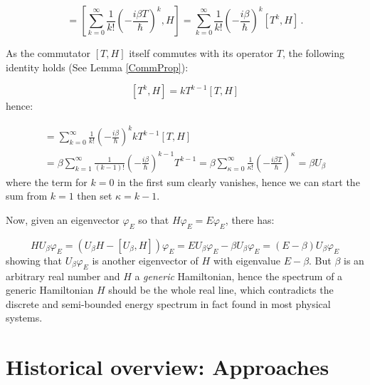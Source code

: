 \begin{equation}
[U_{\beta}, H]  =
\left[
  \sum_{k=0}^{\infty} \frac{1}{k!} \left(- \frac{i\beta T}{\hbar} \right)^k, H
\right]         =
\sum_{k=0}^{\infty} \frac{1}{k!} \left(- \frac{i\beta}{\hbar} \right)^k [T^k, H] \,\text{.}
\end{equation}

As the commutator $[T, H]$ itself commutes with its operator $T$,
the following identity holds (See Lemma \ref{CommProp}):

$$
[T^k, H] = kT^{k-1}[T, H]
$$
hence:

\begin{multline}
[U_{\beta}, H]  =
\sum_{k=0}^{\infty} \frac{1}{k!} \left(- \frac{i\beta}{\hbar} \right)^k kT^{k-1}[T, H] \\ =
\beta\sum_{k=1}^{\infty} \frac{1}{(k-1)!} \left(- \frac{i\beta}{\hbar} \right)^{k-1} T^{k-1} =
\beta\sum_{\kappa=0}^{\infty} \frac{1}{\kappa!} \left(- \frac{i\beta T}{\hbar} \right)^{\kappa}  =
\beta U_{\beta}
\end{multline}
where the term for $k=0$ in the first sum clearly vanishes, hence we can start the sum from
$k=1$ then set $\kappa=k-1$.

Now, given an eigenvector $\varphi_{E}$ so that $H\varphi_{E}=E\varphi_{E}$, there has:

$$
HU_{\beta}\varphi_{E} = (U_{\beta}H - [U_{\beta}, H])\varphi_{E} =
EU_{\beta}\varphi_{E} - \beta U_{\beta}\varphi_{E} = (E-\beta)U_{\beta}\varphi_{E}
$$
showing that $U_{\beta}\varphi_{E}$ is another eigenvector of $H$ with eigenvalue
$E-\beta$. But $\beta$ is an arbitrary real number and $H$ a \emph{generic} Hamiltonian,
hence the spectrum of a generic Hamiltonian $H$ should
be the whole real line, which contradicts the discrete and semi-bounded energy spectrum
in fact found in most physical systems.

\section{Historical overview: Approaches}


